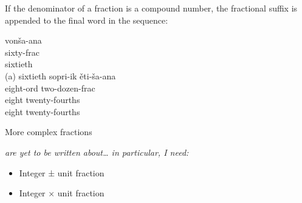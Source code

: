 \documentclass[grammar]{subfiles}
\begin{document}
  If the denominator of a fraction is a compound number, the fractional suffix is appended to the final word in the sequence:

  \begin{exe}
    \ex
    \begin{xlist}
      \ex {}
      \glll vonša-ana\\
      sixty-\acs{frac}\\
      sixtieth\\
      \glt (a) sixtieth
      \ex {}
      \glll sopri-ik ěti-ša-ana\\
      eight-\acs{ord} two-dozen-\acs{frac}\\
      eight twenty-fourths\\
      \glt eight twenty-fourths
    \end{xlist}
  \end{exe}


  More complex fractions {\em are yet to be written about… in particular, I need:
    \begin{itemize}
      \item Integer ± unit fraction
      \item Integer × unit fraction
    \end{itemize}
  }
\end{document}
